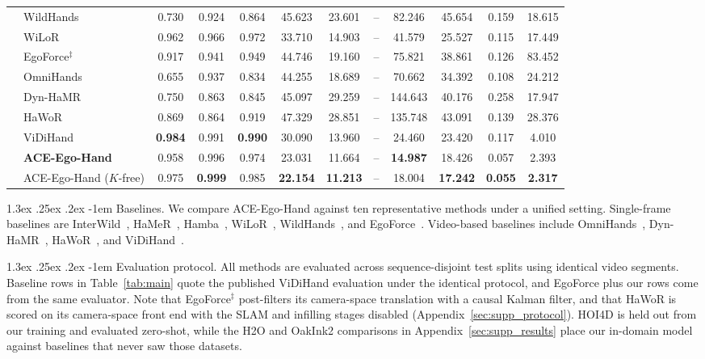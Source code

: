 \documentclass[10pt,twocolumn,letterpaper]{article}
\makeatletter
\renewcommand\paragraph{\@startsection{paragraph}{4}{\z@}%
  {1.3ex \@plus .25ex \@minus .2ex}%
  {-1em}%
  {\normalfont\normalsize\bfseries}}
\newcommand{\method}{ACE-Ego-Hand} %
\newcommand{\best}[1]{\textbf{#1}}
\makeatother
\begin{document}
\begin{table}[t]
{\begin{tabular}{@{}ll ccc ccc ccc c@{}}
 & WildHands & 0.730 & 0.924 & 0.864 & 45.623 & 23.601 & -- & 82.246 & 45.654 & 0.159 & 18.615 \\
 & WiLoR & 0.962 & 0.966 & 0.972 & 33.710 & 14.903 & -- & 41.579 & 25.527 & 0.115 & 17.449 \\
 & EgoForce$^{\ddagger}$ & 0.917 & 0.941 & 0.949 & 44.746 & 19.160 & -- & 75.821 & 38.861 & 0.126 & 83.452 \\
 & OmniHands & 0.655 & 0.937 & 0.834 & 44.255 & 18.689 & -- & 70.662 & 34.392 & 0.108 & 24.212 \\
 & Dyn-HaMR & 0.750 & 0.863 & 0.845 & 45.097 & 29.259 & -- & 144.643 & 40.176 & 0.258 & 17.947 \\
 & HaWoR & 0.869 & 0.864 & 0.919 & 47.329 & 28.851 & -- & 135.748 & 43.091 & 0.139 & 28.376 \\
 & ViDiHand & \best{0.984} & 0.991 & \best{0.990} & 30.090 & 13.960 & -- & 24.460 & 23.420 & 0.117 & 4.010 \\
 & \textbf{\method{}} & 0.958 & 0.996 & 0.974 & 23.031 & 11.664 & -- & \best{14.987} & 18.426 & 0.057 & 2.393 \\
 & \method{} ($K$-free) & 0.975 & \best{0.999} & 0.985 & \best{22.154} & \best{11.213} & -- & 18.004 & \best{17.242} & \best{0.055} & \best{2.317} \\
\bottomrule
\end{tabular}}
\end{table}

\paragraph{Baselines.}
We compare \method{} against ten representative methods under a unified setting. Single-frame baselines are InterWild~\citep{interwild2023}, HaMeR~\citep{hamer2024}, Hamba~\citep{hamba2024}, WiLoR~\citep{wilor2025}, WildHands~\citep{wildhands2024}, and EgoForce~\citep{egoforce2026}. Video-based baselines include OmniHands~\citep{omnihands2025}, Dyn-HaMR~\citep{dynhamr2025}, HaWoR~\citep{hawor2025}, and ViDiHand~\citep{vidihand2026}.

\paragraph{Evaluation protocol.}
All methods are evaluated across sequence-disjoint test splits using identical video segments. Baseline rows in Table~\ref{tab:main} quote the published ViDiHand evaluation under the identical protocol, and EgoForce plus our rows come from the same evaluator. Note that EgoForce$^{\ddagger}$ post-filters its camera-space translation with a causal Kalman filter, and that HaWoR is scored on its camera-space front end with the SLAM and infilling stages disabled (Appendix~\ref{sec:supp_protocol}). HOI4D is held out from our training and evaluated zero-shot, while the H2O and OakInk2 comparisons in Appendix~\ref{sec:supp_results} place our in-domain model against baselines that never saw those datasets.
\end{document}
